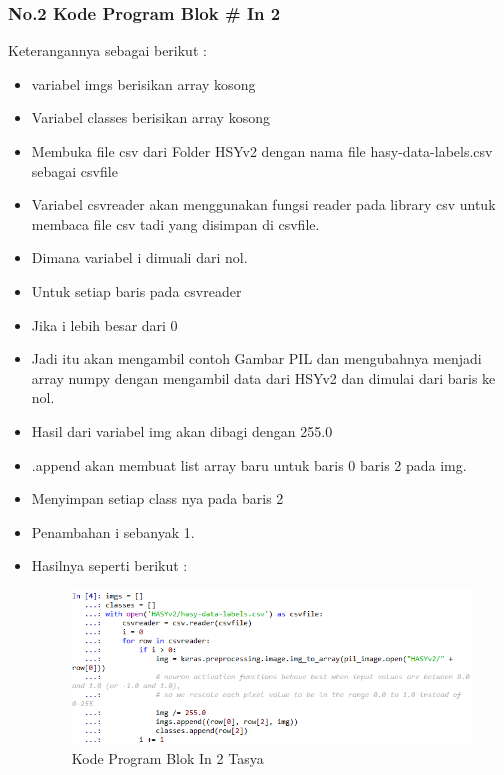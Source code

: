 \subsubsection{No.2 Kode Program Blok \# In 2}

Keterangannya sebagai berikut :\\
\begin{itemize}
\item variabel imgs berisikan array kosong
\item Variabel classes berisikan array kosong
\item Membuka file csv dari Folder HSYv2 dengan nama file hasy-data-labels.csv sebagai csvfile
\item Variabel csvreader akan menggunakan fungsi reader pada library csv untuk membaca file csv tadi yang disimpan di csvfile.
\item Dimana variabel i dimuali dari nol.
\item Untuk setiap baris pada  csvreader
\item Jika i lebih besar dari 0
\item Jadi itu akan mengambil contoh Gambar PIL dan mengubahnya menjadi array numpy dengan mengambil data dari HSYv2 dan dimulai dari baris ke nol.
\item Hasil dari variabel img akan dibagi dengan 255.0
\item .append akan membuat list array baru untuk baris 0 baris 2 pada img.
\item Menyimpan setiap class nya  pada baris 2
\item Penambahan i sebanyak 1. 
\item Hasilnya seperti berikut :\\
\begin{figure}[ht]
\centering
\includegraphics[scale=0.5]{figures/Chapter 7/1164086/Praktek/chapter7tasya15.png}
\caption{Kode Program Blok In 2 Tasya}
\label{Praktek}
\end{figure}
\end{itemize}

